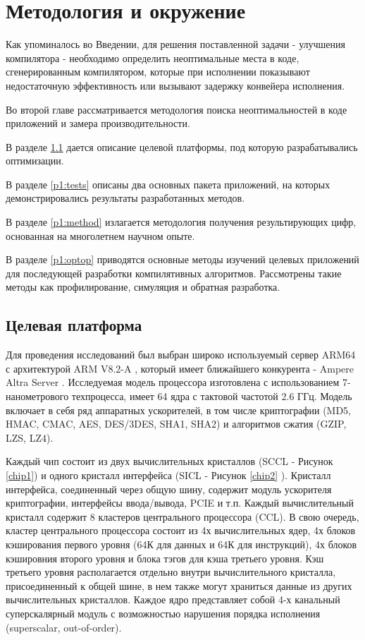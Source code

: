 \chapter{Методология и окружение}\label{ch:chMethod}
Как упоминалось во Введении, для решения поставленной задачи - улучшения компилятора - необходимо определить неоптимальные места в коде, сгенерированным компилятором, которые при исполнении показывают недостаточную эффективность или вызывают задержку конвейера исполнения.

Во второй главе рассматривается методология поиска неоптимальностей в коде приложений и замера производительности. 

В разделе \ref{p1:platform} дается описание целевой платформы, под которую разрабатывались оптимизации.

В разделе  \ref{p1:tests} описаны два основных пакета приложений, на которых демонстрировались результаты разработанных методов.

В разделе \ref{p1:method} излагается методология получения результирующих цифр, основанная на многолетнем научном опыте.

В разделе \ref{p1:optop} приводятся основные методы изучений целевых приложений для последующей разработки компилятивных алгоритмов. Рассмотрены такие методы как профилирование, симуляция и обратная разработка.


\section{Целевая платформа}\label{p1:platform}
Для проведения исследований был выбран широко используемый сервер ARM64 с архитектурой ARM V8.2-A \cite{reid2016trustworthy,xia2021kunpeng}, который имеет ближайшего конкурента - Ampere Altra Server \cite{cha2021ampere}. Исследуемая модель процессора изготовлена с использованием 7-нанометрового техпроцесса, имеет 64 ядра с тактовой частотой 2.6 ГГц. Модель включает в себя  ряд аппаратных ускорителей, в том числе криптографии (MD5, HMAC, CMAC, AES, DES/3DES,  SHA1, SHA2) и  алгоритмов сжатия (GZIP, LZS, LZ4). 

Каждый чип состоит из двух вычислительных кристаллов (SCCL - Рисунок \ref{chip1})  и одного кристалл интерфейса (SICL - Рисунок \ref{chip2} ). Кристалл интерфейса, соединенный через общую шину, содержит модуль ускорителя криптографии, интерфейсы ввода/вывода, PCIE и т.п. Каждый вычислительный кристалл содержит 8 кластеров центрального процессора (CCL). В свою очередь, кластер центрального процессора состоит из 4х вычислительных ядер, 4х блоков кэширования первого уровня (64К для данных и 64К для инструкций), 4х блоков кэшировния второго уровня и блока тэгов для кэша третьего уровня. Кэш третьего уровня располагается отдельно внутри вычислительного кристалла, присоединенный к общей шине, в нем также могут храниться данные из других вычислительных кристаллов. Каждое ядро представляет собой 4-х канальный суперскалярный модуль с возможностью нарушения порядка исполнения (superscalar, out-of-order).

